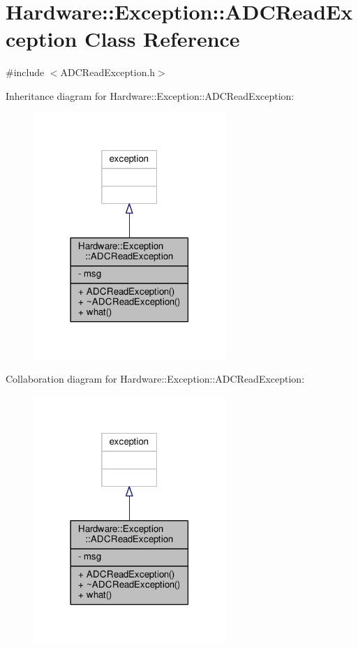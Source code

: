 \hypertarget{class_hardware_1_1_exception_1_1_a_d_c_read_exception}{}\section{Hardware\+:\+:Exception\+:\+:A\+D\+C\+Read\+Exception Class Reference}
\label{class_hardware_1_1_exception_1_1_a_d_c_read_exception}


{\ttfamily \#include $<$A\+D\+C\+Read\+Exception.\+h$>$}



Inheritance diagram for Hardware\+:\+:Exception\+:\+:A\+D\+C\+Read\+Exception\+:\nopagebreak
\begin{figure}[H]
\begin{center}
\leavevmode
\includegraphics[width=206pt]{class_hardware_1_1_exception_1_1_a_d_c_read_exception__inherit__graph}
\end{center}
\end{figure}


Collaboration diagram for Hardware\+:\+:Exception\+:\+:A\+D\+C\+Read\+Exception\+:\nopagebreak
\begin{figure}[H]
\begin{center}
\leavevmode
\includegraphics[width=206pt]{class_hardware_1_1_exception_1_1_a_d_c_read_exception__coll__graph}
\end{center}
\end{figure}

